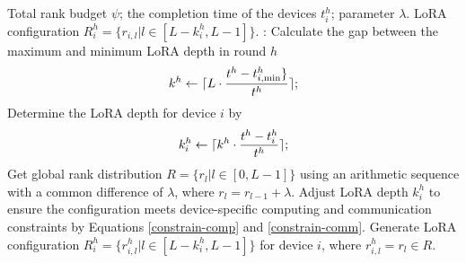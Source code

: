 
\begin{algorithm}[t]
\caption{ LoRA Configuration Determination}\label{alg:lora-config}
\label{alg:device-group}
\begin{algorithmic}[1]
\Require Total rank budget $\psi$; the completion time of the devices $t_i^h$; parameter $\lambda$.
\Ensure LoRA configuration $R_i^h = \{ r_{i,l}|l \in [L - k_i^h, L - 1] \}$.
: 
\State Calculate the gap between the maximum and minimum LoRA depth in round $h$
            \vspace{-0.4cm}
            \begin{equation}
                k^h \leftarrow \lceil L \cdot \frac{t^h - t_{i,\min}^h\}}{t^h} \rceil; \nonumber
                \vspace{-0.4cm}
            \end{equation}
\State Determine the LoRA depth for device $i$ by
    \vspace{-0.4cm}
    \begin{equation}
        \vspace{-0.4cm}
        k_i^h \leftarrow \lceil k^h \cdot \frac{t^h - t_i^h}{t^h} \rceil; \nonumber
    \end{equation}
\State Get global rank distribution $R = \{r_l | l \in [0, L - 1]\}$ using an arithmetic sequence with a common difference of $\lambda$, where $r_l = r_{l - 1} + \lambda$.
\State Adjust LoRA depth $k_i^h$ to ensure the configuration meets device-specific computing and communication constraints by Equations \ref{constrain-comp} and \ref{constrain-comm}.
\State Generate LoRA configuration $R_i^h = \{ r_{i,l}^h| l \in [L - k_i^h, L - 1] \}$ for device $i$, where $r_{i,l}^h = r_l \in R$.
\EndFunction
\end{algorithmic}
\end{algorithm}

